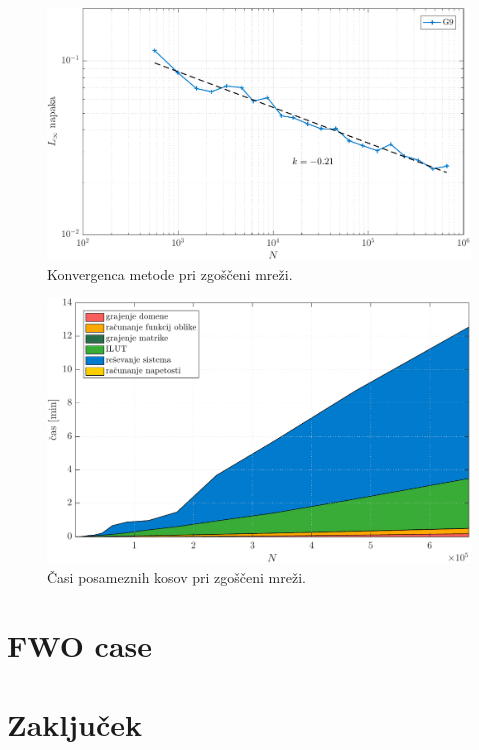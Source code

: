 \documentclass[12pt,a4paper,twoside]{article}
\theoremstyle{definition} %
\theoremstyle{plain} %
\numberwithin{equation}{section}
\newlength{\iw}
\begin{document}
\begin{figure}[h]
  \centering
  \includegraphics[width=\iw]{images/hertzian_refined_convergence.pdf}
  \caption{Konvergenca metode pri zgoščeni mreži.}
  \label{fig:hertz-refined-convergence}
\end{figure}

\begin{figure}[h]
  \centering
  \includegraphics[width=\iw]{images/hertzian_refined_time.pdf}
  \caption{Časi posameznih kosov pri zgoščeni mreži.}
  \label{fig:hertz-refined-time}
\end{figure}

\section{FWO case}

\section{Zaključek}

\cleardoublepage
{}


\end{document}
